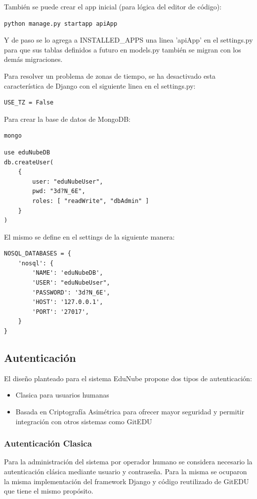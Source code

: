 También se puede crear el app inicial (para lógica del editor de código):
\begin{lstlisting}
python manage.py startapp apiApp
\end{lstlisting}

Y de paso se lo agrega a INSTALLED\_APPS una linea 'apiApp' en el settings.py para que sus tablas definidos a futuro en models.py también se migran con los demás migraciones.

Para resolver un problema de zonas de tiempo, se ha desactivado esta característica de Django con el siguiente linea en el settings.py:
\lstset{language=Python}
\begin{lstlisting}
USE_TZ = False
\end{lstlisting}
\lstset{language=Bash}

Para crear la base de datos de MongoDB:
\begin{lstlisting}
mongo
\end{lstlisting}
\lstset{language=sql}
\begin{lstlisting}
use eduNubeDB
db.createUser(
    {
        user: "eduNubeUser",
        pwd: "3d?N_6E",
        roles: [ "readWrite", "dbAdmin" ]
    }
)
\end{lstlisting}
\lstset{language=Bash}

El mismo se define en el settings de la siguiente manera:
\lstset{language=Python}
\begin{lstlisting}
NOSQL_DATABASES = {
    'nosql': {
        'NAME': 'eduNubeDB',
        'USER': "eduNubeUser",
        'PASSWORD': '3d?N_6E',
        'HOST': '127.0.0.1',
        'PORT': '27017',
    }
}
\end{lstlisting}
\lstset{language=Bash}

\subsection{Autenticación}
El diseño planteado para el sistema EduNube propone dos tipos de autenticación:
\begin{itemize}
\item Clasica para usuarios humanas
\item Basada en Criptografía Asimétrica para ofrecer mayor seguridad y permitir integración con otros sistemas como GitEDU
\end{itemize}

\subsubsection{Autenticación Clasica}
Para la administración del sistema por operador humano se considera necesario la autenticación clásica mediante usuario y contraseña. Para la misma se ocuparon la misma implementación del framework Django y código reutilizado de GitEDU que tiene el mismo propósito.

